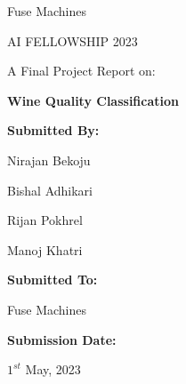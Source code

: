 \bigskip
\bigskip
\bigskip
\bigskip
\bigskip
\bigskip


\begin{center}
    
Fuse Machines 

AI FELLOWSHIP 2023

\bigskip
\bigskip
\bigskip
\bigskip
\bigskip
\bigskip
\noindent\makebox[\linewidth]
{\rule{15cm}{0.4pt}}
A Final Project Report on:

\textbf{Wine Quality Classification}
\noindent\makebox[\linewidth]
{\rule{15cm}{0.4pt}}

\bigskip
\bigskip
\bigskip
\bigskip
\bigskip
\bigskip
\bigskip
\bigskip
\textbf{Submitted By:}

Nirajan Bekoju

Bishal Adhikari

Rijan Pokhrel

Manoj Khatri

\bigskip
\bigskip
\bigskip
\bigskip
\textbf{Submitted To:}

Fuse Machines

\bigskip
\bigskip
\bigskip
\bigskip
\textbf{Submission Date:} 

$1^{st}$ May, 2023

\end{center}

\tableofcontents
\clearpage
\listoffigures
\clearpage
\listoftables
\clearpage